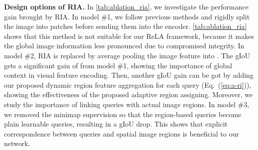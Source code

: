 \documentclass[10pt,twocolumn,letterpaper]{article}
\begin{document}
\begin{table}[t]
  \renewcommand\arraystretch{1.0}
  \centering
  \footnotesize
 \caption{Ablation study of RIA design options.}
 \vspace{-3.6mm}
 \centering
  \label{tab:ablation_ria}
 \vspace{-0.1in}
\end{table}




\textbf{Design options of RIA.} In \cref{tab:ablation_ria}, we investigate the performance gain brought by RIA. In model \#1, we follow previous methods \cite{dosovitskiy2020image, kim2022restr} and rigidly split the image into  patches before sending them into the encoder. \cref{tab:ablation_ria} shows that this method is not suitable for our ReLA framework, because it makes the global image information less pronounced due to compromised integrity. In model \#2, RIA is replaced by average pooling the image feature into . The gIoU gets a significant gain of  from model \#1, showing the importance of global context in visual feature encoding. Then, another  gIoU gain can be got by adding our proposed dynamic region feature aggregation for each query (Eq.~(\ref{eq:a-ri})), showing the effectiveness of the proposed 
adaptive region assigning.
Moreover, we study the importance of linking queries with actual image regions. In model \#3, we removed the minimap supervision so that the region-based queries  become plain learnable queries, resulting in a  gIoU drop. This shows that explicit correspondence between queries and spatial image regions is beneficial to our network.
\end{document}
